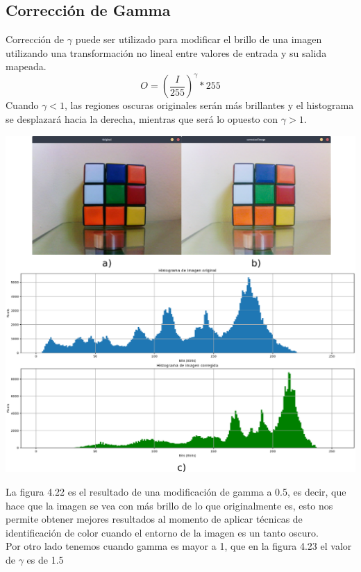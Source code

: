 \subsection{Corrección de Gamma}
Corrección de $\gamma$ puede ser utilizado para modificar el brillo de una imagen utilizando una transformación no lineal entre
valores de entrada y su salida mapeada.
\begin{equation}
	O = \left( \frac{I}{255} \right)^\gamma * 255
\end{equation}
Cuando $\gamma <1$, las regiones oscuras originales serán más brillantes y el histograma se desplazará hacia la derecha, mientras que será
lo opuesto con $\gamma> 1$.
\begin{center}
	\includegraphics[width=0.75 \textwidth]{Contenido/Cuerpo/Capitulo4/Fig23.eps}
	\label{Fig9}
\end{center}
La figura 4.22 es el resultado de una modificación de gamma a 0.5, es decir, que hace que la imagen se vea con más brillo de lo que originalmente
es, esto nos permite obtener mejores resultados al momento de aplicar técnicas de identificación de color cuando el entorno de la imagen
es un tanto oscuro.\\
Por otro lado tenemos cuando gamma es mayor a 1, que en la figura 4.23 el valor de $\gamma$ es de 1.5
